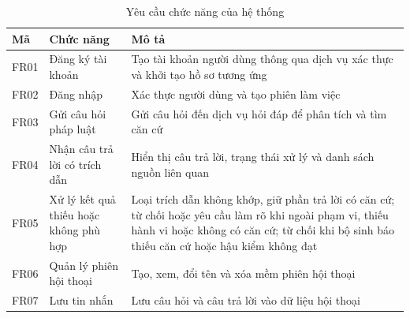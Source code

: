 \documentclass[12pt,a4paper,oneside]{report}
\begin{document}
\begin{longtable}{|L{1.4cm}|L{4.6cm}|L{8.5cm}|}
  \caption{Yêu cầu chức năng của hệ thống}\label{tab:functional-requirements}                                                                                                                                                                                   \\
  \hline
  \textbf{Mã} & \textbf{Chức năng}                     & \textbf{Mô tả}                                                                                                                                                                                         \\
  \hline
  FR01        & Đăng ký tài khoản                      & Tạo tài khoản người dùng thông qua dịch vụ xác thực và khởi tạo hồ sơ tương ứng                                                                                                                        \\
  \hline
  FR02        & Đăng nhập                              & Xác thực người dùng và tạo phiên làm việc                                                                                                                                                              \\
  \hline
  FR03        & Gửi câu hỏi pháp luật                  & Gửi câu hỏi đến dịch vụ hỏi đáp để phân tích và tìm căn cứ                                                                                                                                             \\
  \hline
  FR04        & Nhận câu trả lời có trích dẫn          & Hiển thị câu trả lời, trạng thái xử lý và danh sách nguồn liên quan                                                                                                                                    \\
  \hline
  FR05        & Xử lý kết quả thiếu hoặc không phù hợp & Loại trích dẫn không khớp, giữ phần trả lời có căn cứ; từ chối hoặc yêu cầu làm rõ khi ngoài phạm vi, thiếu hành vi hoặc không có căn cứ; từ chối khi bộ sinh báo thiếu căn cứ hoặc hậu kiểm không đạt \\
  \hline
  FR06        & Quản lý phiên hội thoại                & Tạo, xem, đổi tên và xóa mềm phiên hội thoại                                                                                                                                                           \\
  \hline
  FR07        & Lưu tin nhắn                           & Lưu câu hỏi và câu trả lời vào dữ liệu hội thoại                                                                                                                                                       \\

\end{longtable}
\end{document}
